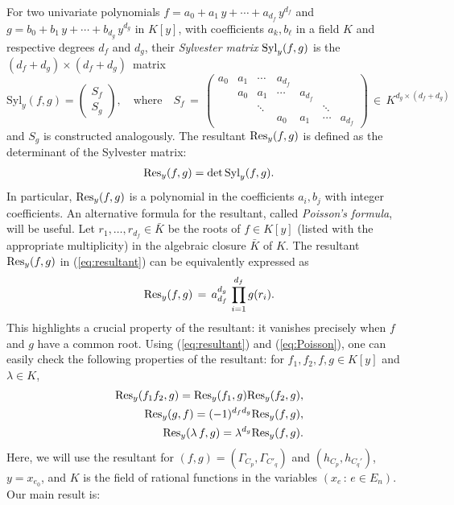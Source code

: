 \documentclass[a4paper, 11pt, twoside]{article}
\theoremstyle{plain}
\begin{document}
\medskip
For two univariate polynomials  $f = a_0 + a_1 \, y + \cdots + a_{d_f} \, y^{d_f}$ and $g = b_0 + b_1 \, y + \cdots + b_{d_g} \, y^{d_g}$ in $K[y]$, with coefficients $a_k, b_\ell$ in a field $K$ and respective degrees $d_f$ and $d_g$, their  \emph{Sylvester matrix} ${\rm Syl}_y(f,g)$ is the $(d_f+d_g) \times (d_f + d_g)$~matrix 
\[
\mathrm{Syl}_y(f,g)= \begin{pmatrix}
S_f \\ S_g
\end{pmatrix}, \quad \text{where} \quad S_f \, = \, 
\begin{pmatrix}
a_0 & a_1 & \cdots & a_{d_f} &        &        \\
    & a_0 & a_1    & \cdots & a_{d_f} &        \\
    &     & \ddots &        &         & \ddots \\
    &     &        & a_0    & a_1     & \cdots & a_{d_f} 
    \end{pmatrix} \, \in \, K^{d_g \times (d_f+d_g)}
\]
and $S_g$ is constructed analogously. The  resultant ${\rm Res}_y(f,g)$ is defined as the determinant of the Sylvester matrix:
\begin{align}\label{eq:resultant}
{\rm Res}_y(f,g) =\det {\rm Syl}_y(f,g).
\end{align}
 In particular, ${\rm Res}_y(f,g)$ is a polynomial in the coefficients $a_i, b_j$ with integer coefficients.
 An alternative formula for the resultant, 
called \emph{Poisson's formula}, will be useful. 
Let $r_1, \ldots, r_{d_f}\in \bar{K}$ be the roots of $f \in K[y]$ (listed with the appropriate multiplicity) in the algebraic closure  $\bar{K}$   of $K$.
The  resultant ${\rm Res}_y(f,g)$ in (\ref{eq:resultant}) can be equivalently expressed as 
\begin{equation} \label{eq:Poisson}
{\rm Res}_y(f,g) \, = \, a_{d_f}^{d_g} \, \prod_{i = 1}^{d_f} g(r_i).
\end{equation}
This highlights a crucial property of the resultant: it vanishes precisely when $f$ and $g$ have a common root. 
 Using (\ref{eq:resultant}) and (\ref{eq:Poisson}), one can easily check the following properties of the resultant: for $f_1,f_2,f,g\in K[y]$ and $\lambda\in K$,
 \begin{align}
{\rm Res}_y(f_1f_2,g) = {\rm Res}_y(f_1,g){\rm Res}_y(f_2,g), \label{eq:Poisson1}\\
{\rm Res}_y(g,f) = (-1)^{d_fd_g} {\rm Res}_y(f,g), \label{eq:Poisson2} \\
{\rm Res}_y(\lambda \, f, g) = \lambda^{d_g} {\rm Res}_y(f,g).\label{eq:Poisson3}
 \end{align}
Here, we will use the resultant  for $(f,g) = (\Gamma_{C_p}, \Gamma_{C'_q})$ and  $(h_{C_p}, h_{C_q'})$, $y = x_{e_0}$, 
and $K$ is the field of rational functions 
in the variables $(x_e \, : \, e \in E_n)$. Our main result is: 
\end{document}
